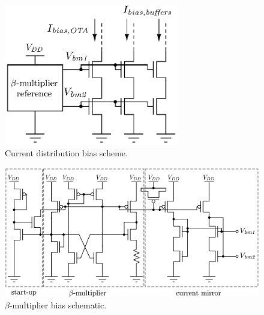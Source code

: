 \begin{figure}[!t]
	\centering
	\includegraphics[width=3in]{./Figures/Filter/bias_all_post.eps}
	\caption{Current distribution bias scheme.}\label{fig:bias_all_post}
\end{figure}
\begin{figure}[!t]
	\centering
	\includegraphics[width=6in]{./Figures/Filter/bias_filter_post}
	\caption{$\beta$-multiplier bias schematic.}\label{fig:bias_filter_post}
\end{figure}